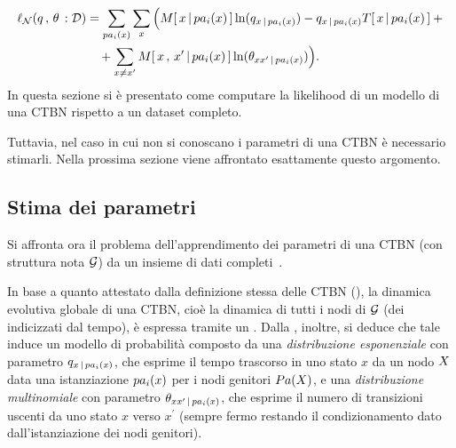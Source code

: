{
\footnotesize
\begin{equation}\label{eq:ctbn-log-likelihood}
\begin{split}
\ell_{\conceptsym{N}}(q\,,\,\theta\,:\conceptsym{D}) &= \sum_{pa_i(\setel{x})}\sum_{x}\Big(\mstat{x\,\arrowvert\,pa_i(\setel{x})}\ln(q_{x\,\arrowvert\,pa_i(\setel{x})})- q_{x\,\arrowvert\,pa_i(\setel{x})}\tstat{x\,\arrowvert\,pa_i(\setel{x})}\:+ \\
& \quad  + \sum_{x\neq x^{\prime}}\mstat[x]{x^{\prime}\,\arrowvert\,pa_i(\setel{x})}\ln(\theta_{xx^{\prime}\,\arrowvert\,pa_i(\setel{x})})\Big)\text{.}
\end{split}
\end{equation}
}
In questa sezione si è presentato come computare la likelihood di un modello di una \acs{CTBN} rispetto a un dataset completo.

Tuttavia, nel caso in cui non si conoscano i parametri di una \acs{CTBN} è necessario stimarli. Nella prossima sezione viene affrontato esattamente questo argomento.

\subsection{Stima dei parametri}
\label{sec:ctbn-params}
Si affronta ora il problema dell'apprendimento dei parametri di una \acl{CTBN} (con struttura nota $\mathcal{G}$) da un insieme di dati completi~\citep[si veda][sezione 5.1]{Nodelman2007}.

In base a quanto attestato dalla definizione stessa delle \acs{CTBN} (), la dinamica evolutiva globale di una \acs{CTBN}, cioè la dinamica di tutti i nodi di $\mathcal{G}$ (dei \mprocess{} \cond{} indicizzati dal tempo), è espressa tramite un \mprocess*{} \omog*{}. Dalla , inoltre, si deduce che tale \mprocess*{} induce un modello di probabilità composto da una \emph{distribuzione esponenziale} con parametro $q_{x\,\arrowvert\,pa_i(\mathnormal{x})}$, che esprime il tempo trascorso in uno stato $x$ da un nodo $\mathnormal{X}$ data una istanziazione $pa_i(\mathnormal{x})$ per i nodi genitori $Pa(\mathnormal{X})$, e una \emph{distribuzione multinomiale} con parametro $\theta_{xx^\prime\,\arrowvert\,pa_i(\mathnormal{x})}$, che esprime il numero di transizioni uscenti da uno stato $x$ verso $x^\prime$ (sempre fermo restando il condizionamento dato dall'istanziazione dei nodi genitori).

